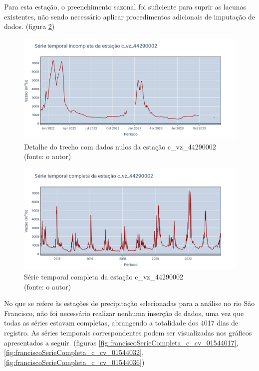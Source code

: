 Para esta estação, o preenchimento sazonal foi suficiente para suprir as lacunas existentes, não sendo necessário aplicar procedimentos adicionais de imputação de dados. (figura \ref{fig:franciscoSerieCompleta_c_vz_44290002})

\begin{figure}[!h]
	\centering
	\includegraphics[scale=0.25]{Figuras/rio_sao_francisco/franciscoSerieIncompleta_c_vz_44290002-detalhe.png}
	\caption{Detalhe do trecho com dados nulos da estação c\_vz\_44290002\\(fonte: o autor)}
	\label{fig:franciscoSerieIncompleta_c_vz_44290002-detalhe}
\end{figure}

\begin{figure}[!h]
	\centering
	\includegraphics[scale=0.25]{Figuras/rio_sao_francisco/franciscoSerieCompleta_c_vz_44290002.png}
	\caption{Série temporal completa da estação c\_vz\_44290002\\(fonte: o autor)}
	\label{fig:franciscoSerieCompleta_c_vz_44290002}
\end{figure}
\clearpage

No que se refere às estações de precipitação selecionadas para a análise no rio São Francisco, não foi necessário realizar nenhuma inserção de dados, uma vez que todas as séries estavam completas, abrangendo a totalidade dos 4017 dias de registro. As séries temporais correspondentes podem ser visualizadas nos gráficos apresentados a seguir. (figuras \ref{fig:franciscoSerieCompleta_c_cv_01544017}, \ref{fig:franciscoSerieCompleta_c_cv_01544032}, \ref{fig:franciscoSerieCompleta_c_cv_01544036})

